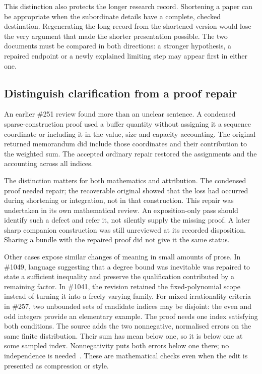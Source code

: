 This distinction also protects the longer research record. Shortening a
paper can be appropriate when the subordinate details have a complete,
checked destination. Regenerating the long record from the shortened version
would lose the very argument that made the shorter presentation possible.
The two documents must be compared in both directions: a stronger hypothesis,
a repaired endpoint or a newly explained limiting step may appear first in
either one.

\subsection{Distinguish clarification from a proof repair}

An earlier \#251 review found more than an unclear sentence. A condensed
sparse-construction proof used a buffer quantity without assigning it a
sequence coordinate or including it in the value, size and capacity accounting.
The original returned memorandum did include those coordinates and their
contribution to the weighted sum. The accepted ordinary repair restored the
assignments and the accounting across all indices.

The distinction matters for both mathematics and attribution. The condensed
proof needed repair; the recoverable original showed that the loss had occurred
during shortening or integration, not in that construction. This repair was
undertaken in its own mathematical review. An exposition-only pass should
identify such a defect and refer it, not silently supply the missing proof.
A later sharp companion construction was still unreviewed at its recorded
disposition. Sharing a bundle with the repaired proof did not give it the
same status.

Other cases expose similar changes of meaning in small amounts of prose.
In \#1049, language suggesting that a degree bound was inevitable was repaired
to state a sufficient inequality and preserve the qualification contributed
by a remaining factor. In \#1041, the revision retained the fixed-polynomial
scope instead of turning it into a freely varying family. For mixed
irrationality criteria in \#257, two unbounded sets of candidate indices
may be disjoint: the even and odd integers provide an elementary example.
The proof needs one index satisfying both conditions. The source adds the
two nonnegative, normalised errors on the same finite distribution. Their
sum has mean below one, so it is below one at some sampled index.
Nonnegativity puts both errors below one there; no independence is needed~\cite[common-index argument]{paper257}.
These are mathematical checks even when the edit is presented as compression or style.

